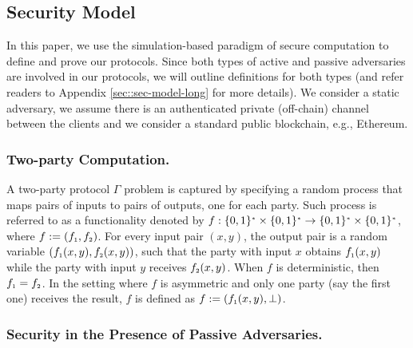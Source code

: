 

\vs 
\vs
\vs

\subsection{Security Model}\label{sec::sec-model}

In this paper, we use the simulation-based paradigm of secure computation \cite{DBLP:books/cu/Goldreich2004} to define and prove our protocols. Since both types of active and passive adversaries are involved in our protocols, we will outline definitions for both types (and refer readers to Appendix \ref{sec::sec-model-long} for more details).  We consider a static adversary, we assume there is an authenticated private (off-chain) channel between the clients and we consider a standard public blockchain, e.g., Ethereum.
%
 
 \vs
 \vs
 \subsubsection{Two-party Computation.} A two-party protocol $\Gamma$ problem is captured by specifying a random process that maps pairs of inputs to pairs of outputs, one for each party. Such process is referred to as a functionality denoted by  $f:\{0,1\}^{\scriptscriptstyle *}\times\{0,1\}^{\scriptscriptstyle *}\rightarrow\{0,1\}^{\scriptscriptstyle *}\times\{0,1\}^{\scriptscriptstyle *}$, where $f:=(f_{\scriptscriptstyle 1},f_{\scriptscriptstyle 2})$. For every input pair $(x,y)$, the output pair is a random variable $(f_{\scriptscriptstyle 1} (x,y), f_{\scriptscriptstyle 2} (x,y))$, such that the party with input $x$ obtains $f_{\scriptscriptstyle 1} (x,y)$ while the party with input $y$ receives $f_{\scriptscriptstyle 2} (x,y)$. When $f$ is deterministic, then $f_{\scriptscriptstyle 1} =f_{\scriptscriptstyle 2}$. In the setting where $f$ is asymmetric and only one party (say the first one) receives the result, $f$ is defined as $f:=(f_{\scriptscriptstyle 1}(x,y), \bot)$. 
 
 \vs
 \vs
 \subsubsection{Security in the Presence of Passive Adversaries.} 
 
  
